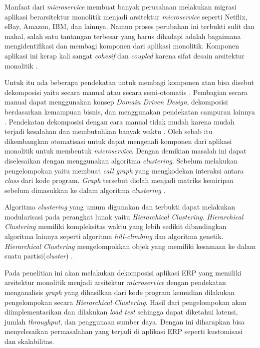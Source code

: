 Manfaat dari \textit{microservice} membuat banyak perusahaan melakukan migrasi aplikasi berarsitektur monolitik menjadi arsitektur \textit{microservice} seperti Netflix, eBay, Amazon, IBM, dan lainnya. Namun proses perubahan ini terbukti sulit dan mahal, salah satu tantangan terbesar yang harus dihadapi adalah bagaimana mengidentifikasi dan membagi komponen dari aplikasi monolitik. Komponen aplikasi ini kerap kali sangat \textit{cohesif} dan  \textit{coupled} karena sifat desain arsitektur monolitik \cite{ECD}.

Untuk itu ada beberapa pendekatan untuk membagi komponen atau bisa disebut dekomposisi yaitu secara manual atau secara semi-otomatis \cite{5B1}. Pembagian secara manual dapat menggunakan konsep \textit{Domain Driven Design}, dekomposisi berdasarkan kemampuan bisnis, dan menggunakan pendekatan campuran lainnya \cite{6C1}. Pendekatan dekomposisi dengan cara manual tidak mudah karena mudah terjadi kesalahan dan membutuhkan banyak waktu  \cite{5B1}. Oleh sebab itu dikembangkan otomatisasi untuk dapat mengenali komponen dari aplikasi monolitik untuk membentuk \textit{microservice}. Dengan demikian masalah ini dapat diselesaikan dengan menggunakan algoritma \textit{clustering}. Sebelum melakukan pengelompokan yaitu membuat \textit{call graph} yang mengkodekan interaksi antara \textit{class} dari kode program. \textit{Graph} tersebut diolah menjadi matriks kemiripan sebelum dimasukkan ke dalam algoritma \textit{clustering} \cite{ECD}.

Algoritma \textit{clustering} yang umum digunakan dan terbukti dapat melakukan modularisasi pada perangkat lunak yaitu \textit{Hierarchical Clustering}. \textit{Hierarchical Clustering} memiliki kompleksitas waktu yang lebih sedikit dibandingkan algoritma lainnya seperti algoritma \textit{hill-climbing} dan algoritma genetik. \textit{Hierarchical Clustering} mengelompokkan objek yang memiliki kesamaan ke dalam suatu partisi(\textit{cluster}) \cite{8EA}.

Pada penelitian ini akan melakukan dekomposisi aplikasi ERP yang memiliki arsitektur monolitik menjadi arsitektur \textit{microservice} dengan pendekatan menganalisis \textit{graph} yang dihasilkan dari kode program kemudian dilakukan pengelompokan secara \textit{Hierarchical Clustering}. Hasil dari pengelompokan akan diimplementasikan dan dilakukan \textit{load test} sehingga dapat diketahui latensi, jumlah \textit{throughput}, dan penggunaan sumber daya. Dengan ini diharapkan bisa menyelesaikan permasalahan yang terjadi di aplikasi ERP seperti kustomisasi dan skalabilitas.


